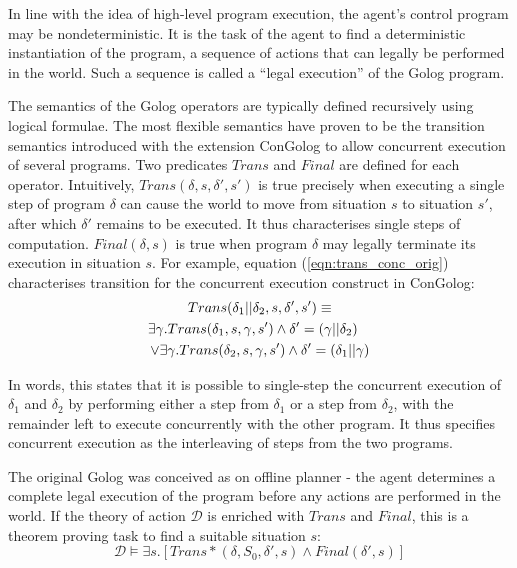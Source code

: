 \documentclass[letterpaper]{article}
\begin{document}
In line with the idea of high-level program execution, the agent's
control program may be nondeterministic. It is the task of the agent to
find a deterministic instantiation of the program, a sequence of actions
that can legally be performed in the world. Such a sequence is called a ``legal
execution'' of the Golog program.

The semantics of the Golog operators are typically defined recursively
using logical formulae. The most flexible semantics have proven to
be the transition semantics introduced with the extension ConGolog
\cite{giacomo00congolog} to allow concurrent execution of several
programs. Two predicates $Trans$ and $Final$ are defined for each
operator. Intuitively, $Trans(\delta,s,\delta',s')$ is true precisely
when executing a single step of program $\delta$ can cause the world
to move from situation $s$ to situation $s'$, after which $\delta'$
remains to be executed. It thus characterises single steps of computation.
$Final(\delta,s)$ is true when program
$\delta$ may legally terminate its execution in situation $s$.  For example,
equation (\ref{eqn:trans_conc_orig}) characterises transition for the 
concurrent execution construct in ConGolog:
\begin{multline}
\label{eqn:trans_conc_orig}
Trans(\delta_{1}||\delta_{2},s,\delta',s')\equiv\\
\shoveright{\exists\gamma. Trans(\delta_{1},s,\gamma,s')\wedge \delta'=(\gamma||\delta_2)}\\
\vee\exists\gamma. Trans(\delta_{2},s,\gamma,s')\wedge \delta'=(\delta_1 || \gamma)
\end{multline}

In words, this states that it is possible to single-step the concurrent
execution of $\delta_1$ and $\delta_2$ by performing either a step from
$\delta_1$ or a step from $\delta_2$, with the remainder left to execute
concurrently with the other program.
It thus specifies concurrent execution as the interleaving of steps from
the two programs.

The original Golog was conceived as on offline planner - the agent
determines a complete legal execution of the program before any actions
are performed in the world.  If the theory of action $\mathcal{D}$ is enriched
with $Trans$ and $Final$, this is a theorem proving task to find a suitable
situation $s$:
\begin{equation}
\label{eqn:golog_execution}
\mathcal{D}\models\exists s.\left[Trans*(\delta,S_{0},\delta',s)\wedge Final(\delta',s)\right]
\end{equation}
\end{document}
